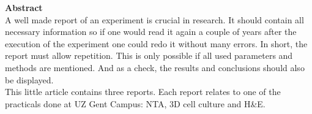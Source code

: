 \documentclass[dutch, a4paper, 11pt]{article}
\begin{document}



\begin{tcolorbox}[colframe=ugent_blue, colback=ugent_blue!10, enhanced jigsaw, boxrule=0.5pt]
{\bf Abstract}\\
A well made report of an experiment is crucial in research. It should contain all necessary information so if one would read
it again a couple of years after the execution of the experiment one could redo it without many errors. In short, the report 
must allow repetition. This is only possible if all used parameters and methods are mentioned. And as a check, the results and
conclusions should also be displayed.\\
This little article contains three reports. Each report relates to one of the practicals done at UZ Gent Campus: NTA, 3D cell culture and H\&E. 
\end{tcolorbox}


\end{document}
